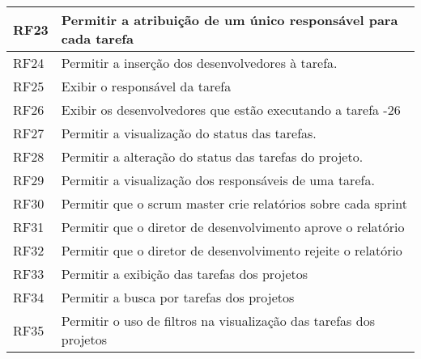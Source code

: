 \begin{table}[H]
\begin{tabular}{|l|l|}
            RF23 & Permitir a atribuição de um único responsável para cada tarefa                                                                                        \\ \hline
            RF24 & Permitir a inserção dos desenvolvedores à tarefa.                                                                                                     \\ \hline
            RF25 & Exibir o responsável da tarefa                                                                                                                        \\ \hline
            RF26 & Exibir os desenvolvedores que estão executando a tarefa -26                                                                                           \\ \hline
            RF27 & Permitir a visualização do status das tarefas.                                                                                                        \\ \hline
            RF28 & Permitir a alteração do status das tarefas do projeto.                                                                                                \\ \hline
            RF29 & Permitir a visualização dos responsáveis de uma tarefa.                                                                                               \\ \hline
            RF30 & Permitir que o scrum master crie relatórios sobre cada sprint                                                                                         \\ \hline
            RF31 & Permitir que o diretor de desenvolvimento aprove o relatório                                                                                          \\ \hline
            RF32 & Permitir que o diretor de desenvolvimento rejeite o relatório                                                                                         \\ \hline
            RF33 & Permitir a exibição das tarefas dos projetos                                                                                                          \\ \hline
            RF34 & Permitir a busca por tarefas dos projetos                                                                                                             \\ \hline
            RF35 & Permitir o uso de filtros na visualização das tarefas dos projetos                                                                                    \\ \hline
        \end{tabular}
    \end{table}
